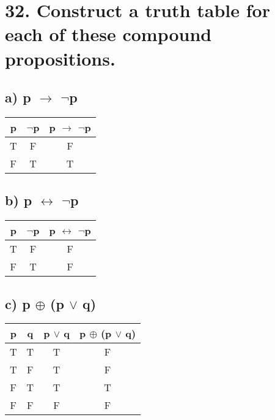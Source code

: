 \documentclass[11pt, oneside]{article} %
\numberwithin{equation}{section} %
\numberwithin{figure}{section} %
\begin{document}
\begin{table}[!htp]
\section{32. Construct a truth table for each of these compound propositions.}

\subsection{a) p $\rightarrow$ $\neg$p}
\begin{tabular}{c c c}
\hline\hline
p & $\neg$p &  p $\rightarrow$ $\neg$p \\ [0.5ex] %
\hline
T & F & F\\
F & T & T \\ [1ex]
\hline
\end{tabular}
\label{table:nonlin}
\end{table}

\begin{table}[!htp]
\subsection{b) p $\leftrightarrow$ $\neg$p}
\begin{tabular}{c c c}
\hline\hline
p & $\neg$p &  p $\leftrightarrow$ $\neg$p \\ [0.5ex] %
\hline
T & F & F\\
F & T & F \\ [1ex]
\hline
\end{tabular}
\label{table:nonlin}
\end{table}

\begin{table}[!htp]
\subsection{c) p $\oplus$ (p  $\vee$ q)}
\begin{tabular}{c c c c}
\hline\hline
p & q &  p  $\vee$ q & p $\oplus$ (p  $\vee$ q) \\ [0.5ex] %
\hline
T & T & T & F\\
T & F & T & F \\
F & T & T & T \\
F & F & F & F\\ [1ex]
\hline
\end{tabular}
\label{table:nonlin}
\end{table}
\end{document}
